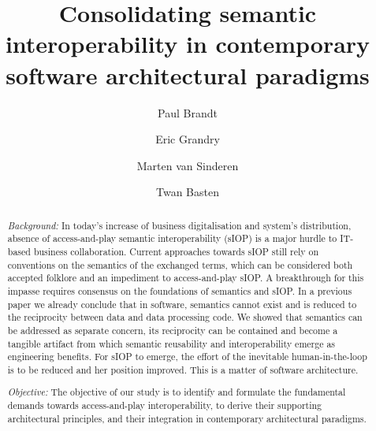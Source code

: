 \documentclass[sort&compress,preprint,authoryear,3p,twocolumn]{elsarticle}
\begin{document}
\begin{frontmatter}

  \title{Consolidating semantic interoperability in contemporary
software architectural paradigms}

\author[1]{Paul
Brandt} \author[2]{Eric
Grandry} \author[3]{Marten van
Sinderen} \author[1]{Twan
Basten}

   

\begin{abstract}
\emph{Background:} In today's increase of business digitalisation and
system's distribution, absence of access-and-play semantic
interoperability (sIOP) is a major hurdle to IT-based business
collaboration. Current approaches towards sIOP still rely on conventions
on the semantics of the exchanged terms, which can be considered both
accepted folklore and an impediment to access-and-play sIOP. A
breakthrough for this impasse requires consensus on the foundations of
semantics and sIOP. In a previous paper we already conclude that in
software, semantics cannot exist and is reduced to the reciprocity
between data and data processing code. We showed that semantics can be
addressed as separate concern, its reciprocity can be contained and
become a tangible artifact from which semantic reusability and
interoperability emerge as engineering benefits. For sIOP to emerge, the
effort of the inevitable human-in-the-loop is to be reduced and her
position improved. This is a matter of software architecture.

\emph{Objective:} The objective of our study is to identify and
formulate the fundamental demands towards access-and-play
interoperability, to derive their supporting architectural principles,
and their integration in contemporary architectural paradigms.


\end{abstract}
\end{frontmatter}
\end{document}
